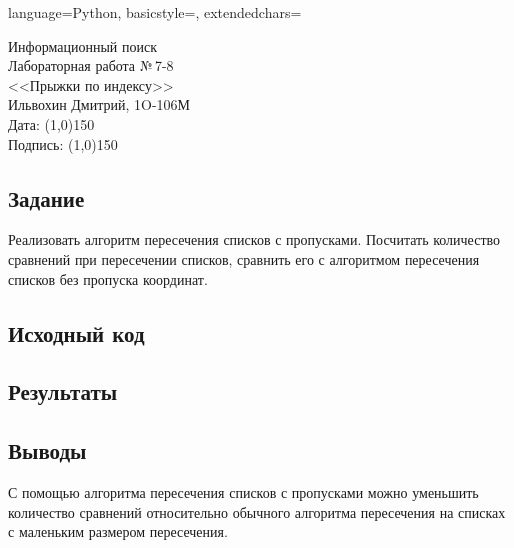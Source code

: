 \documentclass[12pt]{article}
\newcommand{\StudentName}{Ильвохин Дмитрий}
\newcommand{\Group}{1O-106М}
\newcommand{\CourseName}{Информационный поиск}
\newcommand{\LabNum}{7-8}
\newcommand{\Subject}{Прыжки по индексу}
\begin{document}
\lstset
{
        language=Python,
        basicstyle=\footnotesize,%
        extendedchars=\true
}

\begin{flushright}
\Large{
	\CourseName \\
	Лабораторная работа №\,\LabNum \\
	<<\Subject>> \\
  \StudentName, \Group \\
  Дата: \line(1,0){150} \\
  Подпись: \line(1,0){150} \\
}
\end{flushright}

\subsection*{Задание}
Реализовать алгоритм пересечения списков с пропусками.
Посчитать количество сравнений при пересечении списков, сравнить его
с алгоритмом пересечения списков без пропуска координат.

\subsection*{Исходный код}


\subsection*{Результаты}


\subsection*{Выводы}
С помощью алгоритма пересечения списков с пропусками можно уменьшить
количество сравнений относительно обычного алгоритма пересечения на списках
с маленьким размером пересечения.
\end{document}
